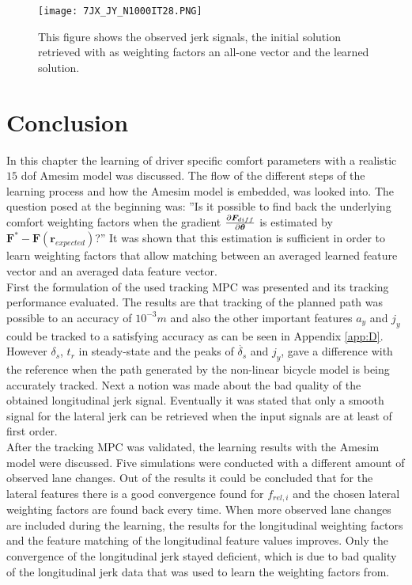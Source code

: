 \begin{figure}[h!]
	\centering
	\texttt{[image: 7JX\_JY\_N1000IT28.PNG]}
	\caption{This figure shows the observed jerk signals, the initial solution retrieved with as weighting factors an all-one vector and the learned solution.}	
	\label{fig:complex_jerk}
\end{figure}
 \newpage                                
\section{Conclusion}
In this chapter the learning of driver specific comfort parameters with a realistic $15$ dof Amesim model was discussed. The flow of the different steps of the learning process and how the Amesim model is embedded, was looked into. The question posed at the beginning was: ''Is it possible to find back the underlying comfort weighting factors when the gradient $\pdv{\bm{F}_{diff}}{\bm{\theta}}$ is estimated by $ \bm{F}^* - \bm{F}(\bm{r}_{expected})$?'' It was shown that this estimation is sufficient in order to learn weighting factors that allow matching between an averaged learned feature vector and an averaged data feature vector.\\

First the formulation of the used tracking MPC was presented and its tracking performance evaluated. The results are that tracking of the planned path was possible to an accuracy of $10^{-3}m$ and also the other important features $a_y$ and $j_y$ could be tracked to a satisfying accuracy as can be seen in Appendix \ref{app:D}. However $\delta_s$, $t_r$ in steady-state and the peaks of $\dot{\delta_s}$ and $j_y$, gave a difference with the reference when the path generated by the non-linear bicycle model is being accurately tracked. Next a notion was made about the bad quality of the obtained longitudinal jerk signal. Eventually it was stated that only a smooth signal for the lateral jerk can be retrieved when the input signals are at least of first order. \\

After the tracking MPC was validated, the learning results with the Amesim model were discussed. Five simulations were conducted with a different amount of observed lane changes. Out of the results it could be concluded that for the lateral features there is a good convergence found for $f_{rel,i}$ and the chosen lateral weighting factors are found back every time. When more observed lane changes are included during the learning, the results for the longitudinal weighting factors and the feature matching of the longitudinal feature values improves. Only the convergence of the longitudinal jerk stayed deficient, which is due to bad quality of the longitudinal jerk data that was used to learn the weighting factors from.



